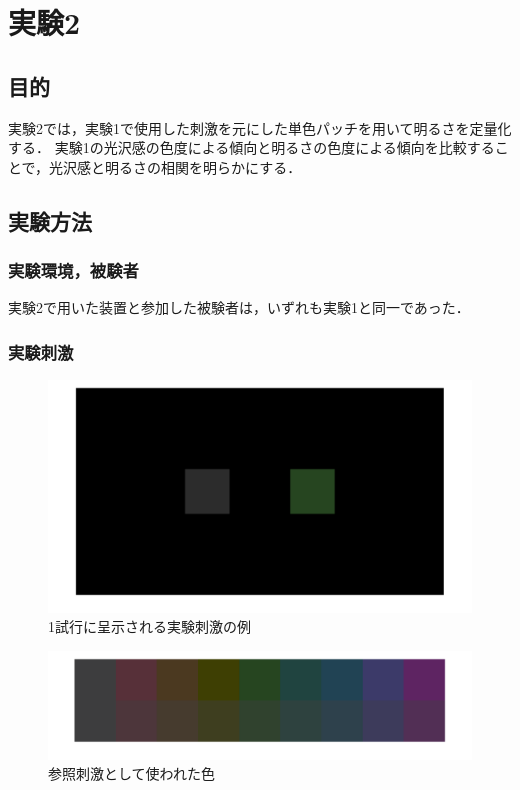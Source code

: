\chapter{実験2}

\section{目的}

    実験2では，実験1で使用した刺激を元にした単色パッチを用いて明るさを定量化する．
    実験1の光沢感の色度による傾向と明るさの色度による傾向を比較することで，光沢感と明るさの相関を明らかにする．


\section{実験方法}
    \subsection{実験環境，被験者}

        実験2で用いた装置と参加した被験者は，いずれも実験1と同一であった．

    \subsection{実験刺激}

        \begin{figure}[h]
            \centering
            \includegraphics[width=14.0cm]{./img/ex2_stimuli2.png}
            \caption{1試行に呈示される実験刺激の例}
            \label{ex1_procedure}
        \end{figure}

        \begin{figure}[h]
            \centering
            \includegraphics[width=14.0cm]{./img/patchStimuli.png}
            \caption{参照刺激として使われた色}
            \label{ex1_procedure}
        \end{figure}

